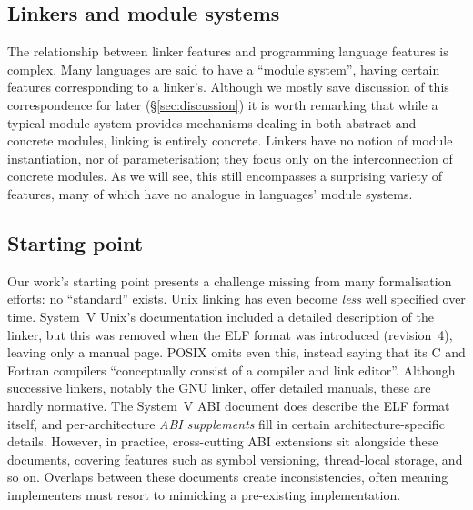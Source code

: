 \subsection{Linkers and module systems}

The relationship between linker features and programming language features is complex.
Many languages are said to have a ``module system'', having certain features corresponding to a linker's.
Although we mostly save discussion of this correspondence for later (\S\ref{sec:discussion})
it is worth remarking that while a typical module system provides mechanisms dealing in both abstract and concrete modules, linking is entirely concrete.
Linkers have no notion of module instantiation, nor of parameterisation; they focus only on the interconnection of concrete modules.
As we will see, this still encompasses a surprising variety of features, many of which have no analogue in languages' module systems.

\subsection{Starting point}

Our work's starting point presents a challenge missing from many formalisation efforts:
no ``standard'' exists.
Unix linking has even become \emph{less} well specified over time.
System~V Unix's documentation included a detailed description of the linker,
but this was removed when the ELF format was introduced (revision~4), 
leaving only a manual page.
POSIX \citep{} omits even this, instead saying that its C and Fortran compilers 
``conceptually consist of a compiler and link editor''.
Although successive linkers, notably the GNU linker, offer detailed manuals, 
these are hardly normative.
The System~V ABI document \citep{} does describe the ELF format itself,
and per-architecture \emph{ABI supplements} fill in certain architecture-specific
details.
However, in practice, cross-cutting ABI extensions sit alongside these documents, covering features such as symbol versioning, thread-local storage, and so on.
Overlaps between these documents create inconsistencies, often meaning implementers must resort to mimicking a pre-existing implementation.
